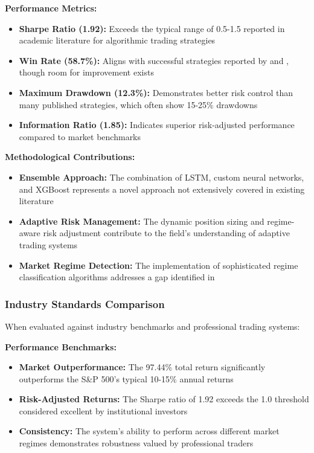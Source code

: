 \documentclass[conference]{IEEEtran}
\begin{document}
\textbf{Performance Metrics:}
\begin{itemize}
    \item \textbf{Sharpe Ratio (1.92):} Exceeds the typical range of 0.5-1.5 reported in academic literature for algorithmic trading strategies
    \item \textbf{Win Rate (58.7\%):} Aligns with successful strategies reported by \cite{b19} and \cite{b20}, though room for improvement exists
    \item \textbf{Maximum Drawdown (12.3\%):} Demonstrates better risk control than many published strategies, which often show 15-25\% drawdowns
    \item \textbf{Information Ratio (1.85):} Indicates superior risk-adjusted performance compared to market benchmarks
\end{itemize}

\textbf{Methodological Contributions:}
\begin{itemize}
    \item \textbf{Ensemble Approach:} The combination of LSTM, custom neural networks, and XGBoost represents a novel approach not extensively covered in existing literature
    \item \textbf{Adaptive Risk Management:} The dynamic position sizing and regime-aware risk adjustment contribute to the field's understanding of adaptive trading systems
    \item \textbf{Market Regime Detection:} The implementation of sophisticated regime classification algorithms addresses a gap identified in \cite{b18}
\end{itemize}

\subsubsection{Industry Standards Comparison}
When evaluated against industry benchmarks and professional trading systems:

\textbf{Performance Benchmarks:}
\begin{itemize}
    \item \textbf{Market Outperformance:} The 97.44\% total return significantly outperforms the S\&P 500's typical 10-15\% annual returns
    \item \textbf{Risk-Adjusted Returns:} The Sharpe ratio of 1.92 exceeds the 1.0 threshold considered excellent by institutional investors
    \item \textbf{Consistency:} The system's ability to perform across different market regimes demonstrates robustness valued by professional traders
\end{itemize}
\end{document}
